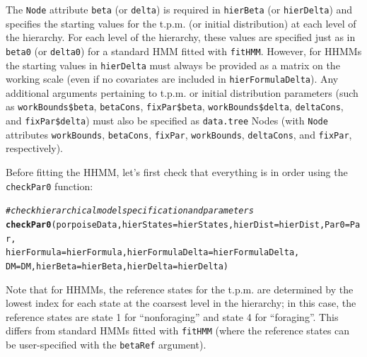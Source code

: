 \documentclass[12pt]{article}\usepackage[]{graphicx}\usepackage[]{color}
\makeatletter
\newcommand{\hlcom}[1]{\textcolor[rgb]{0.678,0.584,0.686}{\textit{#1}}}%
\newcommand{\hlstd}[1]{\textcolor[rgb]{0.345,0.345,0.345}{#1}}%
\newcommand{\hlkwc}[1]{\textcolor[rgb]{0.333,0.667,0.333}{#1}}%
\newcommand{\hlkwd}[1]{\textcolor[rgb]{0.737,0.353,0.396}{\textbf{#1}}}%
\newenvironment{kframe}{%
 \def\at@end@of@kframe{}%
 \ifinner\ifhmode%
  \def\at@end@of@kframe{\end{minipage}}%
  \begin{minipage}{\columnwidth}%
 \fi\fi%
 \def\FrameCommand##1{\hskip\@totalleftmargin \hskip-\fboxsep
 \colorbox{shadecolor}{##1}\hskip-\fboxsep
     \hskip-\linewidth \hskip-\@totalleftmargin \hskip\columnwidth}%
 \MakeFramed {\advance\hsize-\width
   \@totalleftmargin\z@ \linewidth\hsize
   \@setminipage}}%
 {\par\unskip\endMakeFramed%
 \at@end@of@kframe}
\newenvironment{knitrout}{}{} %
\makeatother
\begin{document}
\noindent The \verb|Node| attribute \verb|beta| (or \verb|delta|) is required in \verb|hierBeta| (or \verb|hierDelta|) and specifies the starting values for the t.p.m. (or initial distribution) at each level of the hierarchy. For each level of the hierarchy, these values are specified just as in \verb|beta0| (or \verb|delta0|) for a standard HMM fitted with \verb|fitHMM|. However, for HHMMs the starting values in \verb|hierDelta| must always be provided as a matrix on the working scale (even if no covariates are included in \verb|hierFormulaDelta|). Any additional arguments pertaining to t.p.m. or initial distribution parameters (such as \verb|workBounds$beta|, \verb|betaCons|, \verb|fixPar$beta|, \verb|workBounds$delta|, \verb|deltaCons|, and \verb|fixPar$delta|) must also be specified as \verb|data.tree| Nodes (with \verb|Node| attributes \verb|workBounds|, \verb|betaCons|, \verb|fixPar|, \verb|workBounds|, \verb|deltaCons|, and \verb|fixPar|, respectively).

Before fitting the HHMM, let's first check that everything is in order using the \verb|checkPar0| function:
\begin{knitrout}
\color{fgcolor}\begin{kframe}
\begin{alltt}
\hlcom{# check hierarchical model specification and parameters}
\hlkwd{checkPar0}\hlstd{(porpoiseData,}\hlkwc{hierStates}\hlstd{=hierStates,}\hlkwc{hierDist}\hlstd{=hierDist,}\hlkwc{Par0}\hlstd{=Par,}
          \hlkwc{hierFormula}\hlstd{=hierFormula,}\hlkwc{hierFormulaDelta}\hlstd{=hierFormulaDelta,}
          \hlkwc{DM}\hlstd{=DM,}\hlkwc{hierBeta}\hlstd{=hierBeta,}\hlkwc{hierDelta}\hlstd{=hierDelta)}
\end{alltt}


{\ttfamily\noindent\bfseries{}}\end{kframe}
\end{knitrout}
\noindent Note that for HHMMs, the reference states for the t.p.m. are determined by the lowest index for each state at the coarsest level in the hierarchy; in this case, the reference states are state 1 for ``nonforaging'' and state 4 for ``foraging''. This differs from standard HMMs fitted with \verb|fitHMM| (where the reference states can be user-specified with the \verb|betaRef| argument).  
\end{document}
